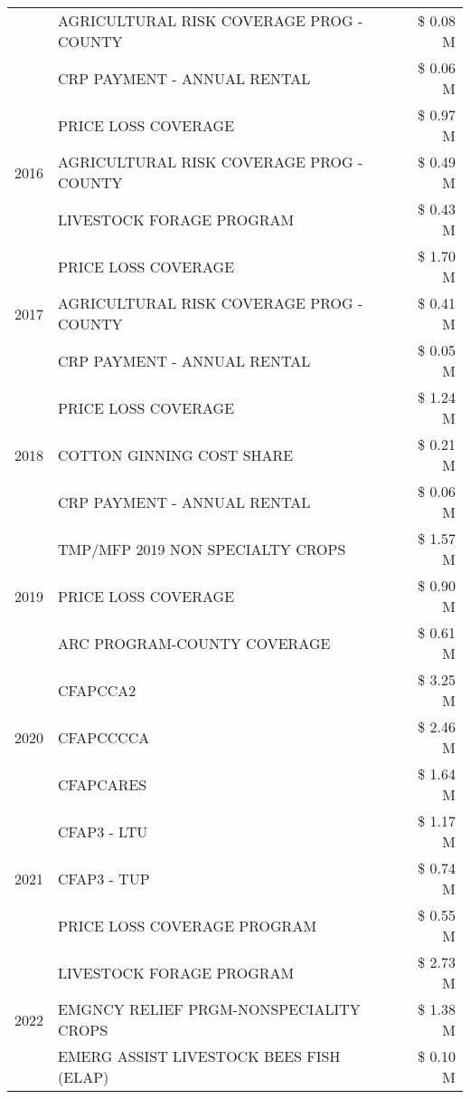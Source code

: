\begin{tabular}{llr}
 & AGRICULTURAL RISK COVERAGE PROG - COUNTY & \$ 0.08 M \\
 & CRP PAYMENT - ANNUAL RENTAL & \$ 0.06 M \\
\cline{1-3}
\multirow[t]{3}{*}{2016} & PRICE LOSS COVERAGE & \$ 0.97 M \\
 & AGRICULTURAL RISK COVERAGE PROG - COUNTY & \$ 0.49 M \\
 & LIVESTOCK FORAGE PROGRAM & \$ 0.43 M \\
\cline{1-3}
\multirow[t]{3}{*}{2017} & PRICE LOSS COVERAGE & \$ 1.70 M \\
 & AGRICULTURAL RISK COVERAGE PROG - COUNTY & \$ 0.41 M \\
 & CRP PAYMENT - ANNUAL RENTAL & \$ 0.05 M \\
\cline{1-3}
\multirow[t]{3}{*}{2018} & PRICE LOSS COVERAGE & \$ 1.24 M \\
 & COTTON GINNING COST SHARE & \$ 0.21 M \\
 & CRP PAYMENT - ANNUAL RENTAL & \$ 0.06 M \\
\cline{1-3}
\multirow[t]{3}{*}{2019} & TMP/MFP 2019 NON SPECIALTY CROPS & \$ 1.57 M \\
 & PRICE LOSS COVERAGE & \$ 0.90 M \\
 & ARC PROGRAM-COUNTY COVERAGE & \$ 0.61 M \\
\cline{1-3}
\multirow[t]{3}{*}{2020} & CFAPCCA2 & \$ 3.25 M \\
 & CFAPCCCCA & \$ 2.46 M \\
 & CFAPCARES & \$ 1.64 M \\
\cline{1-3}
\multirow[t]{3}{*}{2021} & CFAP3 - LTU & \$ 1.17 M \\
 & CFAP3 - TUP & \$ 0.74 M \\
 & PRICE LOSS COVERAGE PROGRAM & \$ 0.55 M \\
\cline{1-3}
\multirow[t]{3}{*}{2022} & LIVESTOCK FORAGE PROGRAM & \$ 2.73 M \\
 & EMGNCY RELIEF PRGM-NONSPECIALITY CROPS & \$ 1.38 M \\
 & EMERG ASSIST LIVESTOCK BEES FISH (ELAP) & \$ 0.10 M \\
\cline{1-3}
\bottomrule
\end{tabular}
